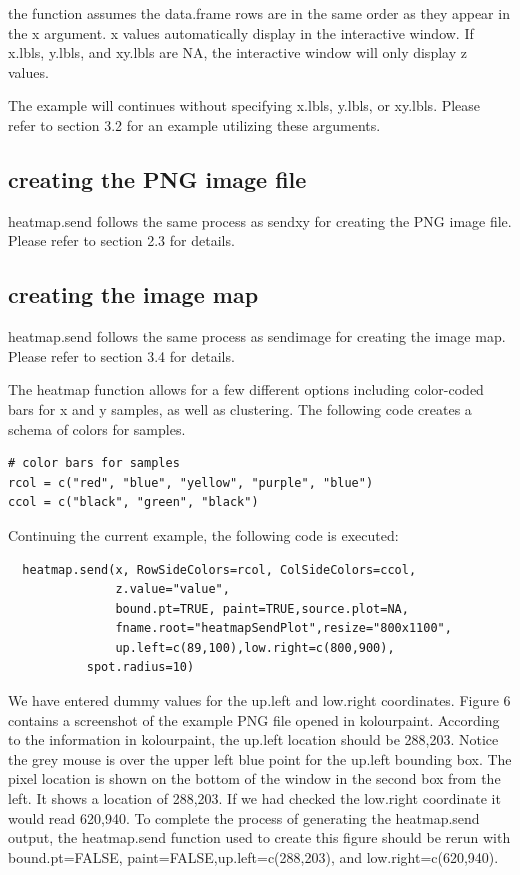 \documentclass[]{article}
\begin{document}
 the function assumes the data.frame rows are in the same order as they appear in the x argument.  \newline
{} x values automatically display in the interactive window. If x.lbls, y.lbls, and xy.lbls are NA, the interactive window will only display z values. \newline

\indent The example will continues without specifying x.lbls, y.lbls, or xy.lbls. Please refer to section 3.2 for an example utilizing these arguments. 


\subsection{creating the PNG image file}

\indent heatmap.send follows the same process as sendxy for creating the PNG image file. Please refer to section 2.3 for details.

\subsection{creating the image map}

\indent heatmap.send follows the same process as sendimage for creating the image map. Please refer to section 3.4 for details.


\indent The heatmap function allows for a few different options including color-coded bars for x and y samples, as well as clustering. The following code creates a schema of colors for samples. 
\begin{verbatim}
# color bars for samples
rcol = c("red", "blue", "yellow", "purple", "blue")
ccol = c("black", "green", "black")
\end{verbatim}


\indent Continuing the current example, the following code is executed:
\begin{verbatim}
  heatmap.send(x, RowSideColors=rcol, ColSideColors=ccol,
               z.value="value",
               bound.pt=TRUE, paint=TRUE,source.plot=NA,
               fname.root="heatmapSendPlot",resize="800x1100",
               up.left=c(89,100),low.right=c(800,900),
	       spot.radius=10)
\end{verbatim}

We have entered dummy values for the up.left and low.right coordinates. Figure 6 contains a screenshot of the example PNG file opened in kolourpaint. According to the information in kolourpaint, the up.left location should be 288,203. Notice the grey mouse is over the upper left blue point for the up.left bounding box. The pixel location is shown on the bottom of the window in the second box from the left. It shows a location of 288,203. If we had checked the low.right coordinate it would read 620,940. To complete the process of generating the heatmap.send output, the heatmap.send function used to create this figure should be rerun with bound.pt=FALSE, paint=FALSE,up.left=c(288,203), and low.right=c(620,940).\newline
\end{document}
